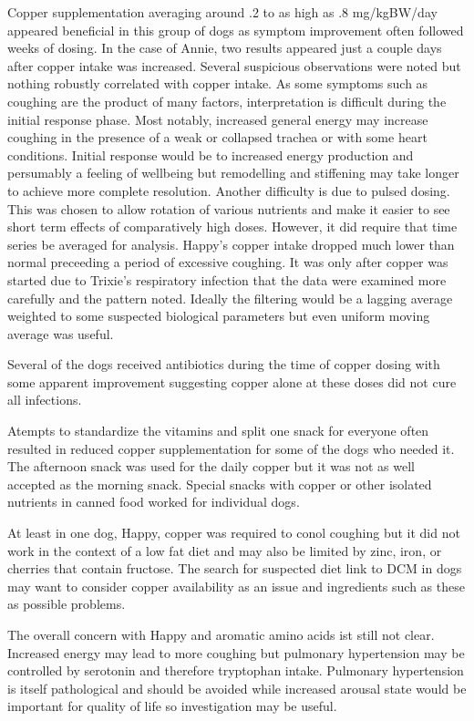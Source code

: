 Copper supplementation averaging around .2 to as high 
as .8 mg/kgBW/day appeared beneficial in this group of
dogs as symptom improvement often followed weeks of dosing.
In the case of Annie, two results appeared just a couple
days after copper intake was increased. 
Several suspicious observations were noted but nothing
robustly correlated with copper intake. 
As some symptoms such as coughing are the product
of many factors, interpretation is difficult during the 
initial response phase. Most notably, increased general
energy may increase coughing in the presence of a weak
or collapsed trachea or with some heart conditions. 
Initial response would be to increased energy production
and persumably a feeling of wellbeing but remodelling
and stiffening 
may take longer to  achieve  more complete  
resolution. Another difficulty is  due to pulsed dosing.
This was chosen to allow rotation of various
nutrients and make it easier to see short term effects
of comparatively high doses. However, it did require 
that time series be averaged  for analysis.
Happy's copper intake dropped much lower than normal
preceeding a period of excessive coughing. It was only
after copper was started due to Trixie's  respiratory infection
that the data were examined more carefully and the pattern
noted. Ideally the filtering would be a lagging average
weighted to some suspected biological parameters but
even uniform moving average was useful.   

Several of the dogs received antibiotics during the time of
copper dosing with some apparent improvement suggesting copper
alone at these doses did not cure all infections.

Atempts to standardize the vitamins and split one snack
for everyone often resulted in reduced copper
supplementation for some of the dogs who needed it.
The afternoon snack was used for the daily copper 
but it was not as well accepted as the morning snack.
Special snacks with copper or other isolated nutrients
in canned food worked for individual dogs. 


At least in one dog, Happy, copper was required to conol
coughing but it did not work in the context of a low fat
diet and may also be limited by zinc, iron, or cherries
that contain fructose.  The search for suspected diet link to
DCM in dogs may want to consider copper availability as an
issue and ingredients such as these as possible problems.


The overall concern with Happy and aromatic amino acids
ist still not clear. Increased energy may lead to more
coughing but 
pulmonary hypertension may be controlled by serotonin
\cite{PMID27927914} and therefore tryptophan intake. 
Pulmonary hypertension is itself pathological and
should be avoided while increased arousal state would
be important for quality of life so investigation may be useful. 


